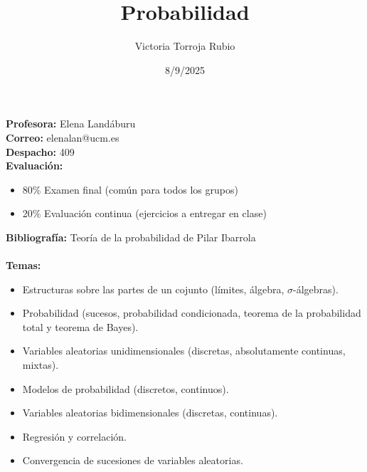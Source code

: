 \documentclass{report}
\begin{document}
\title{Probabilidad}
\author{Victoria Torroja Rubio}
\date{8/9/2025}

\maketitle

\tableofcontents

\pagebreak

\textbf{Profesora:} Elena Landáburu \\
\textbf{Correo:} elenalan@ucm.es \\
\textbf{Despacho:} 409 \\ 
\textbf{Evaluación:} 
\begin{itemize}
\item 80\% Examen final (común para todos los grupos)
\item 20\% Evaluación continua (ejercicios a entregar en clase)
\end{itemize}
\textbf{Bibliografía:} Teoría de la probabilidad de Pilar Ibarrola \\ \\
\textbf{Temas:} 
\begin{itemize}
\item Estructuras sobre las partes de un cojunto (límites, álgebra, $\displaystyle \sigma  $-álgebras).
\item Probabilidad (sucesos, probabilidad condicionada, teorema de la probabilidad total y teorema de Bayes).
\item Variables aleatorias unidimensionales (discretas, absolutamente continuas, mixtas).
\item Modelos de probabilidad (discretos, continuos).
\item Variables aleatorias bidimensionales (discretas, continuas).
\item Regresión y correlación.
\item Convergencia de sucesiones de variables aleatorias.
\end{itemize}




\end{document}
